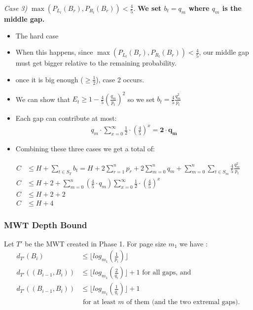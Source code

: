 \documentclass{beamer}
\theoremstyle{plain}
\begin{document}
\begin{frame}
\textit{Case 3)} $\max(P_{L_t}(B_r), P_{R_t}(B_r)) < \frac{4}{5}$. \textbf{We set $b_t = q_m$ where $q_m$ is the middle gap.}

\begin{itemize}
\item The hard case
\item When this happens, since $\max(P_{L_t}(B_r), P_{R_t}(B_r)) < \frac{4}{5}$, our middle gap must get bigger relative to the remaining probability.
\item once it is big enough ($\geq \frac{1}{2}$), case 2 occurs.
\item We can show that $E_t \geq 1 - \frac{4}{5}(\frac{q_m}{p_t})^2$ so we set $b_t = \frac{4}{5}\frac{q_m^2}{p_t}$ 
\item Each gap can contribute at most:
\begin{align*}
q_m \cdot \sum\limits_{x=0}^{\infty} \frac{1}{2} \cdot (\frac{4}{5}) ^ x = \mathbf{2 \cdot q_m}
\end{align*}
\end{itemize}
\end{frame}

\begin{frame}

\begin{itemize}
\item Combining these three cases we get a total of:
\end{itemize}

\begin{align*}
C &\leq H + \sum_{t \in S_T} b_t = H + 2 \sum\limits_{r = 1}^n p_r + 2 \sum\limits_{m = 0}^n q_m + \sum\limits_{m = 0}^n \sum\limits_{t \in S_m} \frac{4}{5}\frac{q_m^2}{p_t}\\
C &\leq H + 2 + \sum\limits_{m = 0}^n (\frac{4}{5} \cdot q_m) \sum\limits_{x=0}^{\infty} \frac{1}{2} \cdot (\frac{4}{5}) ^ x \\
C &\leq H + 2 + 2 \\
C &\leq H + 4
\end{align*}
\end{frame}

\begin{frame}\frametitle{MWT Depth Bound}
Let $T'$ be the MWT created in Phase 1. For page size $m_1$ we have \cite{bose2009efficient}:
\begin{align*} d_{T'}(B_i) &\leq \lfloor log_{m_1}(\frac{1}{p_i}) \rfloor \\
d_{T'}((B_{i-1},B_i)) &\leq \lfloor log_{m_1}(\frac{2}{q_i}) \rfloor + 1 \text{ for all gaps, and}\\
d_{T'}((B_{i-1},B_i)) &\leq \lfloor log_{m_1}(\frac{1}{q_i}) \rfloor + 1 \\ 
&\text{ for at least $m$ of them (and the two extremal gaps).}
 \end{align*}
\end{frame}
\end{document}
